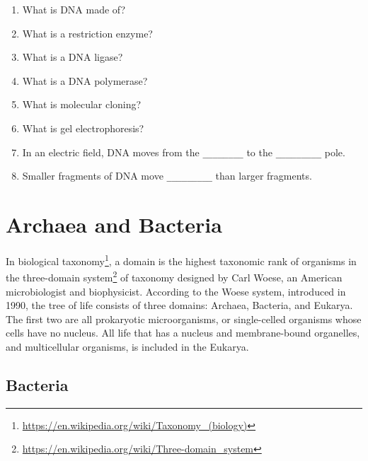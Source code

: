 \documentclass[]{book}
\providecommand{\tightlist}{%
  \setlength{\itemsep}{0pt}\setlength{\parskip}{0pt}}
\let\rmarkdownfootnote\footnote%
\def\footnote{\protect\rmarkdownfootnote}
\renewcommand{\href}[2]{#2\footnote{\url{#1}}}
\begin{document}
\begin{enumerate}
\def\labelenumi{\arabic{enumi}.}
\tightlist
\item
  What is DNA made of?
\item
  What is a restriction enzyme?
\item
  What is a DNA ligase?
\item
  What is a DNA polymerase?
\item
  What is molecular cloning?
\item
  What is gel electrophoresis?
\item
  In an electric field, DNA moves from the \texttt{\_\_\_\_\_\_\_\_} to the \texttt{\_\_\_\_\_\_\_\_\_} pole.
\item
  Smaller fragments of DNA move \texttt{\_\_\_\_\_\_\_\_\_} than larger fragments.
\end{enumerate}

\hypertarget{archaea-and-bacteria}{%
\chapter{Archaea and Bacteria}\label{archaea-and-bacteria}}

In biological \href{https://en.wikipedia.org/wiki/Taxonomy_(biology)}{taxonomy}, a domain is the highest taxonomic rank of organisms in the \href{https://en.wikipedia.org/wiki/Three-domain_system}{three-domain system} of taxonomy designed by Carl Woese, an American microbiologist and biophysicist. According to the Woese system, introduced in 1990, the tree of life consists of three domains: Archaea, Bacteria, and Eukarya. The first two are all prokaryotic microorganisms, or single-celled organisms whose cells have no nucleus. All life that has a nucleus and membrane-bound organelles, and multicellular organisms, is included in the Eukarya.

\hypertarget{bacteria}{%
\section{Bacteria}\label{bacteria}}
\end{document}
